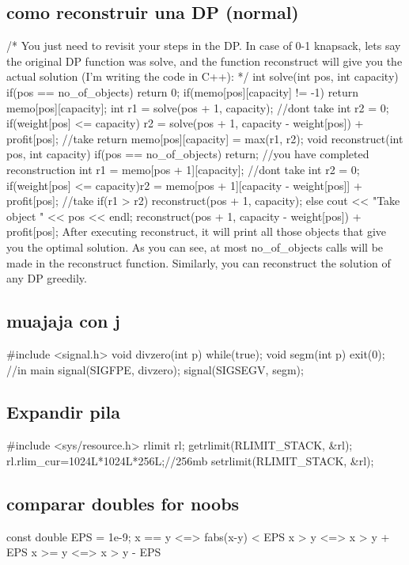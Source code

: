 \subsection{como reconstruir una DP (normal)}
\begin{code}
/*
You just need to revisit your steps in the DP. In case of 0-1 knapsack, lets say the original DP function was solve, and the function reconstruct will give you the actual solution (I'm writing the code in C++):
*/
int solve(int pos, int capacity){
    if(pos == no_of_objects) return 0;
    if(memo[pos][capacity] != -1) return memo[pos][capacity];
    int r1 = solve(pos + 1, capacity); //dont take
    int r2 = 0;
    if(weight[pos] <= capacity){
        r2 = solve(pos + 1, capacity - weight[pos]) + profit[pos]; //take
    }
    return memo[pos][capacity] = max(r1, r2);
}
void reconstruct(int pos, int capacity){
    if(pos == no_of_objects) return; //you have completed reconstruction
    int r1 = memo[pos + 1][capacity]; //dont take
    int r2 = 0;
    if(weight[pos] <= capacity)r2 = memo[pos + 1][capacity - weight[pos]] + profit[pos]; //take
    if(r1 > r2) {reconstruct(pos + 1, capacity);}
    else{
      	cout << "Take object " << pos << endl;
        reconstruct(pos + 1, capacity - weight[pos]) + profit[pos]; 
    }
}
After executing reconstruct, it will print all those objects that give you the optimal solution. As you can see, at most no_of_objects calls will be made in the reconstruct function. 
Similarly, you can reconstruct the solution of any DP greedily.
\end{code}
\subsection{muajaja con j}
\begin{code}
#include <signal.h>
void divzero(int p){
	while(true);}
void segm(int p){
	exit(0);}
//in main
signal(SIGFPE, divzero);
signal(SIGSEGV, segm);
\end{code}
\subsection*{Expandir pila}
\begin{code}
#include <sys/resource.h>
rlimit rl;
getrlimit(RLIMIT_STACK, &rl);
rl.rlim_cur=1024L*1024L*256L;//256mb
setrlimit(RLIMIT_STACK, &rl);
\end{code}

\subsection{comparar doubles for noobs}
\begin{code}
const double EPS = 1e-9;
x == y	<=> fabs(x-y) < EPS
x >  y	<=> x > y + EPS
x >= y	<=> x > y - EPS
\end{code}
